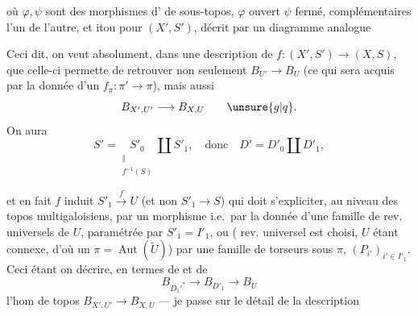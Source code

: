 
où $\varphi,\psi$ sont des morphismes d' de sous-topos, $\varphi$ ouvert $\psi$ fermé, complémentaires l'un de l'autre, et itou pour $(X',S')$, décrit par un diagramme analogue

Ceci dit, on veut absolument, dans une description de
$f:(X',S')\longrightarrow(X,S)$, que celle-ci permette de retrouver non seulement $B_{U'}\longrightarrow B_U$ (ce qui sera acquis par la donnée d'un $f_\pi:\pi'\longrightarrow\pi$), mais aussi
\[
B_{X',U'}\longrightarrow B_{X,U}\qquad\unsure{g|q}.
\]
On aura 
\[
S'=\underset{\substack{\Vert\\f^{-1}(S)}}{S'_0}\amalg S'_1,
\quad\text{donc}\quad D'=D'_0\amalg D'_1,
\]


et en fait $f$ induit $S'_1\xrightarrow{f}U$ (et non $S'_1\longrightarrow S$) qui doit s'expliciter, au niveau  des topos multigaloisiens, par un morphisme
i.e.\ par la donnée d'une famille de rev. universels de $U$, paramétrée par $S'_1=I'_1$, ou ( rev. universel est choisi, $U$ étant connexe, d'où un $\pi=\operatorname{Aut}(\widetilde U)$) par une famille de torseurs sous  $\pi$, $(P_{i'})_{i'\in I'_1}$.
Ceci étant   on  décrire, en termes de
et de
\[
B_{D_1'^*}\longrightarrow B_{D'_1}\longrightarrow B_U
\]
 l'hom de topos $B_{X',U'}\longrightarrow B_{X,U}$
--- je passe sur le détail de la description

